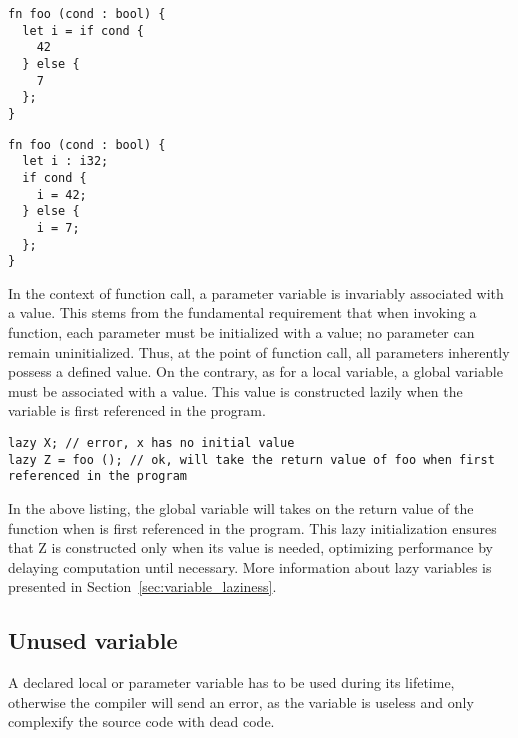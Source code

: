 \hspace{-15pt}%
\begin{minipage}[t][][t]{0.47\linewidth}
  \begin{lstlisting}[style=coloredverbatim, escapechar=@, caption=Valid]
fn foo (cond : bool) {
  let i = if cond {
    42
  } else {
    7
  };
}
  \end{lstlisting}
\end{minipage}\hspace{10pt}%
\begin{minipage}[t][][t]{0.47\linewidth}
  \begin{lstlisting}[style=coloredverbatim, escapechar=@, caption=Invalid]
fn foo (cond : bool) {
  let i : i32;
  if cond {
    i = 42;
  } else {
    i = 7;
  };
}
  \end{lstlisting}
\end{minipage}

In the context of function call, a parameter variable is invariably associated
with a value. This stems from the fundamental requirement that when invoking a
function, each parameter must be initialized with a value; no parameter can
remain uninitialized. Thus, at the point of function call, all parameters
inherently possess a defined value. On the contrary, as for a local variable, a
global variable must be associated with a value. This value is constructed
lazily when the variable is first referenced in the program.

\begin{lstlisting}[style=coloredverbatim]
lazy X; // error, x has no initial value
lazy Z = foo (); // ok, will take the return value of foo when first referenced in the program
\end{lstlisting}

In the above listing, the global variable  will takes on the return
value of the function  when  is first referenced in the
program. This lazy initialization ensures that Z is constructed only when its
value is needed, optimizing performance by delaying computation until necessary.
More information about lazy variables is presented in
Section~\ref{sec:variable_laziness}.

\subsection{Unused variable}
\label{sec:unused_variables}

A declared local or parameter variable has to be used during its lifetime,
otherwise the compiler will send an error, as the variable is useless and only
complexify the source code with dead code.

